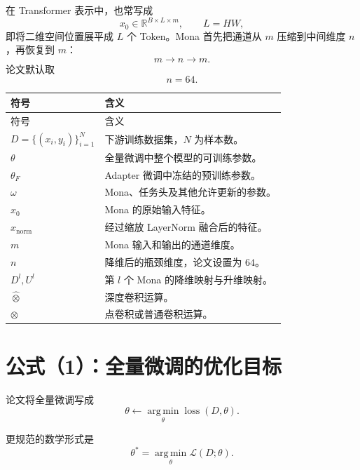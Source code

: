 \documentclass[UTF8,12pt,a4paper,fontset=none]{ctexart}
\newcommand{\Loss}{\mathcal{L}}
\newcommand{\R}{\mathbb{R}}
\newcommand{\argmin}{\operatorname*{arg\,min}}
\begin{document}
在 Transformer 表示中，也常写成
\begin{equation}
 x_0\in\R^{B\times L\times m},\qquad L=HW,
\end{equation}
即将二维空间位置展平成 $L$ 个 Token。Mona 首先把通道从 $m$ 压缩到中间维度 $n$，再恢复到 $m$：
\begin{equation}
 m\longrightarrow n\longrightarrow m.
\end{equation}
论文默认取
\begin{equation}
 n=64.
\end{equation}

\begin{longtable}{>{\centering\arraybackslash}p{2.4cm}p{10.8cm}}
\toprule
符号 & 含义\\
\midrule
\endfirsthead
\toprule
符号 & 含义\\
\midrule
\endhead
$D=\{(x_i,y_i)\}_{i=1}^{N}$ & 下游训练数据集，$N$ 为样本数。\\
$\theta$ & 全量微调中整个模型的可训练参数。\\
$\theta_F$ & Adapter 微调中冻结的预训练参数。\\
$\omega$ & Mona、任务头及其他允许更新的参数。\\
$x_0$ & Mona 的原始输入特征。\\
$x_{\mathrm{norm}}$ & 经过缩放 LayerNorm 融合后的特征。\\
$m$ & Mona 输入和输出的通道维度。\\
$n$ & 降维后的瓶颈维度，论文设置为 $64$。\\
$D^l,U^l$ & 第 $l$ 个 Mona 的降维映射与升维映射。\\
$\widehat{\otimes}$ & 深度卷积运算。\\
$\otimes$ & 点卷积或普通卷积运算。\\
\bottomrule
\end{longtable}

\section{公式（1）：全量微调的优化目标}

论文将全量微调写成
\begin{equation}
 \theta\leftarrow\argmin_{\theta}\operatorname{loss}(D,\theta).
 \tag{1}
\end{equation}

更规范的数学形式是
\begin{equation}
 \theta^{\ast}=\argmin_{\theta}\Loss(D;\theta).
\end{equation}
\end{document}
